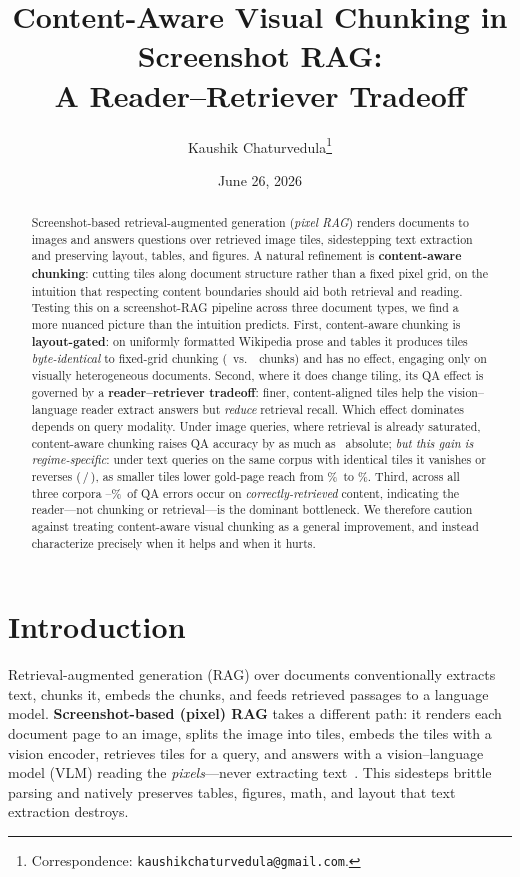 \documentclass[11pt]{article}
\title{\bfseries Content-Aware Visual Chunking in Screenshot RAG:\\ A Reader--Retriever Tradeoff}
\author[1]{Kaushik Chaturvedula\thanks{Correspondence: \texttt{kaushikchaturvedula@gmail.com}.}}
\affil[1]{\textit{Independent Researcher}}
\date{June 26, 2026}
\begin{document}
\maketitle

\begin{abstract}
\noindent
Screenshot-based retrieval-augmented generation (\emph{pixel RAG}) renders documents to images and
answers questions over retrieved image tiles, sidestepping text extraction and preserving layout,
tables, and figures. A natural refinement is \textbf{content-aware chunking}: cutting tiles along
document structure rather than a fixed pixel grid, on the intuition that respecting content boundaries
should aid both retrieval and reading. Testing this on a screenshot-RAG pipeline across three document
types, we find a more nuanced picture than the intuition predicts. First, content-aware chunking is
\textbf{layout-gated}: on uniformly formatted Wikipedia prose and tables it produces tiles
\emph{byte-identical} to fixed-grid chunking (\NqtChunksFixed\ vs.\ \NqtChunksCa\ chunks) and has no
effect, engaging only on visually heterogeneous documents. Second, where it does change tiling, its QA
effect is governed by a \textbf{reader--retriever tradeoff}: finer, content-aligned tiles help the
vision--language reader extract answers but \emph{reduce} retrieval recall. Which effect dominates
depends on query modality. Under image queries, where retrieval is already saturated, content-aware
chunking raises QA accuracy by as much as \CaImgHierDelta\ absolute; \emph{but this gain is
regime-specific}: under text queries on the same corpus with identical tiles it vanishes or reverses
(\CaTxtFlatDelta\,/\,\CaTxtHierDelta), as smaller tiles lower gold-page reach from
\TxtFixedSawGold\%\ to \TxtCaSawGold\%. Third, across all three corpora \ReaderCeilPctMin--\ReaderCeilPctMax\%\
of QA errors occur on \emph{correctly-retrieved} content, indicating the reader---not chunking or
retrieval---is the dominant bottleneck. We therefore caution against treating content-aware visual
chunking as a general improvement, and instead characterize precisely when it helps and when it hurts.
\end{abstract}

\section{Introduction}\label{sec:intro}
Retrieval-augmented generation (RAG) over documents conventionally extracts text, chunks it, embeds the
chunks, and feeds retrieved passages to a language model. \textbf{Screenshot-based (pixel) RAG} takes a
different path: it renders each document page to an image, splits the image into tiles, embeds the tiles
with a vision encoder, retrieves tiles for a query, and answers with a vision--language model (VLM)
reading the \emph{pixels}---never extracting text~\citep{pixelrag}. This sidesteps brittle parsing and
natively preserves tables, figures, math, and layout that text extraction destroys.
\end{document}
